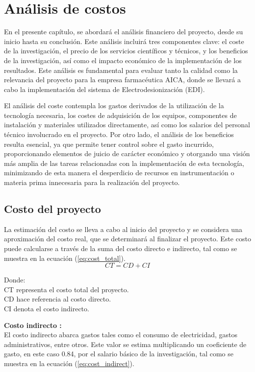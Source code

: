 \chapter{Análisis de costos}
\vspace{-2cm} 
En el presente capítulo, se abordará el análisis financiero del proyecto, desde su inicio hasta su conclusión.
Este análisis incluirá tres componentes clave: el coste de la investigación, el precio de los servicios
científicos y técnicos, y los beneficios de la investigación, así como el impacto económico de la
implementación de los resultados. Este análisis es fundamental para evaluar tanto la calidad como la
relevancia del proyecto para la empresa farmacéutica AICA, donde se llevará a cabo la implementación
del sistema de Electrodesionización (EDI).

El análisis del coste contempla los gastos derivados de la utilización de la tecnología necesaria,
los costes de adquisición de los equipos, componentes de instalación y materiales utilizados directamente,
así como los salarios del personal técnico involucrado en el proyecto. Por otro lado, el análisis de los
beneficios resulta esencial, ya que permite tener control sobre el gasto incurrido, proporcionando elementos
de juicio de carácter económico y otorgando una visión más amplia de las tareas relacionadas con la
implementación de esta tecnología, minimizando de esta manera el desperdicio de recursos en instrumentación
o materia prima innecesaria para la realización del proyecto.


\section{Costo del proyecto}

La estimación del costo se lleva a cabo al inicio del proyecto y se considera una aproximación del costo
real, que se determinará al finalizar el proyecto. Este costo puede calcularse a través de la suma del
costo directo e indirecto, tal como se muestra en la ecuación (\ref{eq:cost_total}).
\begin{equation}
    \label{eq:cost_total}
    CT = CD + CI
\end{equation}

Donde: \\
CT representa el costo total del proyecto. \\
CD hace referencia al costo directo. \\
CI denota el costo indirecto.

\textbf{Costo indirecto :}\\
El costo indirecto abarca gastos tales como el consumo de electricidad, gastos administrativos, entre otros.
Este valor se estima multiplicando un coeficiente de gasto, en este caso 0.84, por el salario básico de la
investigación, tal como se muestra en la ecuación (\ref{eq:cost_indirect}).

